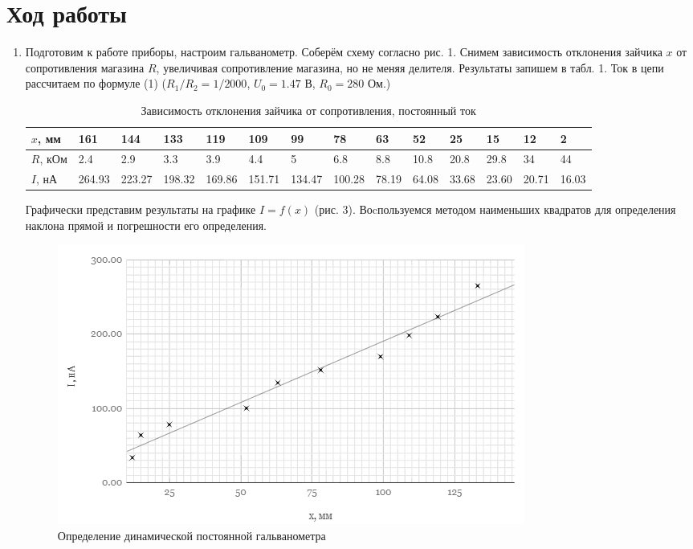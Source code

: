 \documentclass[a4paper]{article}
\begin{document}
\section{Ход работы}
\begin{enumerate}
    \item Подготовим к работе приборы, настроим гальванометр. Соберём схему согласно рис. 1. Снимем зависимость отклонения зайчика $x$ от сопротивления магазина $R$, увеличивая сопротивление магазина, но не меняя делителя. Результаты запишем в табл. 1. Ток в цепи рассчитаем по формуле (1) ($R_1/R_2 = 1/2000$, $U_0 = 1.47$ В, $R_0 = 280$ Ом.)
    
    \begin{table}[h]
    \centering
    \begin{center}
    \caption{Зависимость отклонения зайчика от сопротивления, постоянный ток}
    \end{center}
    \vspace{0.1cm}
    \label{tab:my_label}
    \begin{tabular}{ |p{1.4cm}||p{0.8cm}|p{0.8cm}|p{0.8cm}|p{0.8cm}|p{0.8cm}|p{0.8cm}|p{0.8cm}|p{0.8cm}|p{0.75cm}|p{0.75cm}|p{0.75cm}|p{0.75cm}|p{0.75cm}| }
 \hline
    $x$, мм & 161 & 144 & 133 & 119 & 109 & 99 & 78 & 63 & 52 & 25 & 15 & 12 & 2 \\
\hline
    $R$, кОм & 2.4 & 2.9 & 3.3 & 3.9 & 4.4 & 5 & 6.8 & 8.8 & 10.8 & 20.8 & 29.8 & 34 & 44 \\
\hline
    $I$, нА & 264.93 & 223.27 & 198.32 & 169.86 & 151.71 & 134.47 & 100.28 & 78.19 & 64.08 & 33.68 & 23.60 & 20.71 & 16.03 \\
\hline

    \end{tabular}
\end{table}    

Графически представим результаты на графике $I = f(x)$ (рис. 3). Воcпользуемся методом наименьших квадратов для определения наклона прямой и погрешности его определения.  

\begin{figure}[h]
    \centering
    \includegraphics[width=\textwidth]{graph1.PNG}
    \caption{Определение динамической постоянной гальванометра}
    \label{fig:vac}
\end{figure}


\end{enumerate}
\end{document}
